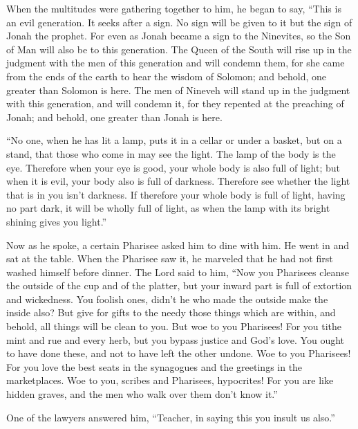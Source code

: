  When the multitudes were gathering together to him, he
began to say, ``This is an evil generation. It seeks after a sign. No
sign will be given to it but the sign of Jonah the prophet.
 For even as Jonah became a sign to the Ninevites, so the
Son of Man will also be to this generation.  The Queen of
the South will rise up in the judgment with the men of this generation
and will condemn them, for she came from the ends of the earth to hear
the wisdom of Solomon; and behold, one greater than Solomon is here.
 The men of Nineveh will stand up in the judgment with this
generation, and will condemn it, for they repented at the preaching of
Jonah; and behold, one greater than Jonah is here.

 ``No one, when he has lit a lamp, puts it in a cellar or
under a basket, but on a stand, that those who come in may see the
light.  The lamp of the body is the eye. Therefore when
your eye is good, your whole body is also full of light; but when it is
evil, your body also is full of darkness.  Therefore see
whether the light that is in you isn't darkness.  If
therefore your whole body is full of light, having no part dark, it will
be wholly full of light, as when the lamp with its bright shining gives
you light.''

 Now as he spoke, a certain Pharisee asked him to dine with
him. He went in and sat at the table.  When the Pharisee
saw it, he marveled that he had not first washed himself before dinner.
 The Lord said to him, ``Now you Pharisees cleanse the
outside of the cup and of the platter, but your inward part is full of
extortion and wickedness.  You foolish ones, didn't he who
made the outside make the inside also?  But give for gifts
to the needy those things which are within, and behold, all things will
be clean to you.  But woe to you Pharisees! For you tithe
mint and rue and every herb, but you bypass justice and God's love. You
ought to have done these, and not to have left the other undone.
 Woe to you Pharisees! For you love the best seats in the
synagogues and the greetings in the marketplaces.  Woe to
you, scribes and Pharisees, hypocrites! For you are like hidden graves,
and the men who walk over them don't know it.''

 One of the lawyers answered him, ``Teacher, in saying this
you insult us also.''

